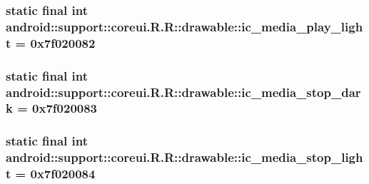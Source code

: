 \hypertarget{classandroid_1_1support_1_1coreui_1_1_r_1_1drawable_38444276cf81f0552a8971483f736eda}{
\subsubsection[{ic\_\-media\_\-play\_\-light}]{\setlength{\rightskip}{0pt plus 5cm}static final int android::support::coreui.R.R::drawable::ic\_\-media\_\-play\_\-light = 0x7f020082}}
\label{classandroid_1_1support_1_1coreui_1_1_r_1_1drawable_38444276cf81f0552a8971483f736eda}


\hypertarget{classandroid_1_1support_1_1coreui_1_1_r_1_1drawable_c2d37e82f6c77f6989c5815b37fa161d}{
\subsubsection[{ic\_\-media\_\-stop\_\-dark}]{\setlength{\rightskip}{0pt plus 5cm}static final int android::support::coreui.R.R::drawable::ic\_\-media\_\-stop\_\-dark = 0x7f020083}}
\label{classandroid_1_1support_1_1coreui_1_1_r_1_1drawable_c2d37e82f6c77f6989c5815b37fa161d}


\hypertarget{classandroid_1_1support_1_1coreui_1_1_r_1_1drawable_b4b4f15e78cd35fb5a2beebd822fb752}{
\subsubsection[{ic\_\-media\_\-stop\_\-light}]{\setlength{\rightskip}{0pt plus 5cm}static final int android::support::coreui.R.R::drawable::ic\_\-media\_\-stop\_\-light = 0x7f020084}}
\label{classandroid_1_1support_1_1coreui_1_1_r_1_1drawable_b4b4f15e78cd35fb5a2beebd822fb752}


